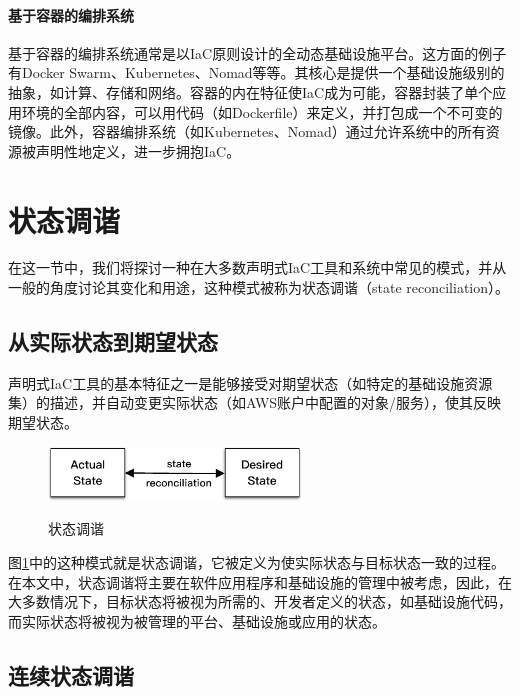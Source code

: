 \documentclass[macfonts,master]{njuthesis}
\begin{document}
\paragraph{基于容器的编排系统}

基于容器的编排系统通常是以IaC原则设计的全动态基础设施平台。这方面的例子有Docker Swarm、Kubernetes、Nomad等等。其核心是提供一个基础设施级别的抽象，如计算、存储和网络。容器的内在特征使IaC成为可能，容器封装了单个应用环境的全部内容，可以用代码（如Dockerfile）来定义，并打包成一个不可变的镜像。此外，容器编排系统（如Kubernetes、Nomad）通过允许系统中的所有资源被声明性地定义，进一步拥抱IaC。

\section{状态调谐}\label{section:reconciliation}

在这一节中，我们将探讨一种在大多数声明式IaC工具和系统中常见的模式，并从一般的角度讨论其变化和用途，这种模式被称为状态调谐（state reconciliation）。

\subsection{从实际状态到期望状态}

声明式IaC工具的基本特征之一是能够接受对期望状态（如特定的基础设施资源集）的描述，并自动变更实际状态（如AWS账户中配置的对象/服务），使其反映期望状态。

\begin{figure}[htbp]
  \centering
  \includegraphics[width=0.6\textwidth]{pics/simple-state-reconciliation.pdf}\\
  \caption{状态调谐}\label{fig:ssr}
\end{figure}

图\ref{fig:ssr}中的这种模式就是状态调谐，它被定义为使实际状态与目标状态一致的过程。在本文中，状态调谐将主要在软件应用程序和基础设施的管理中被考虑，因此，在大多数情况下，目标状态将被视为所需的、开发者定义的状态，如基础设施代码，而实际状态将被视为被管理的平台、基础设施或应用的状态。

\subsection{连续状态调谐}\label{section:continus-reconciliation}
\end{document}

